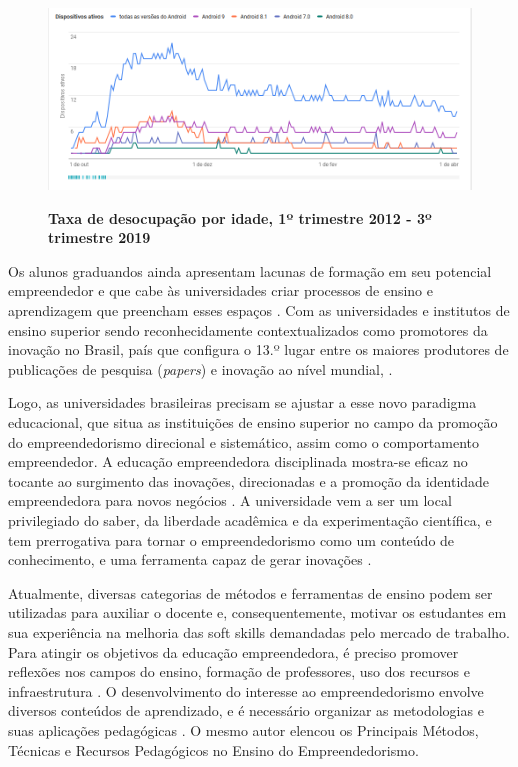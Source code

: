 \begin{figure}[H]
\centering
\caption{\textbf{Taxa de desocupação por idade, 1º trimestre 2012 - 3º trimestre 2019}}
\includegraphics[scale=0.25]{Imagens/taxa_desocupacao.png}
\label{figura_2}
\end{figure}

Os alunos graduandos ainda apresentam lacunas de formação em seu potencial empreendedor e que cabe às universidades criar processos de ensino e aprendizagem que preencham esses espaços \cite{pietrovski_alise_2019}. Com as universidades e institutos de ensino superior sendo reconhecidamente contextualizados como promotores da inovação no Brasil, país que configura o 13.º lugar entre os maiores produtores de publicações de pesquisa (\textit{papers}) e inovação ao nível mundial, . 

Logo, as universidades brasileiras precisam se ajustar a esse novo paradigma educacional, que situa as instituições de ensino superior no campo da promoção do empreendedorismo direcional e sistemático, assim como o comportamento empreendedor. A educação empreendedora disciplinada mostra-se eficaz no tocante ao surgimento das inovações, direcionadas e a promoção da identidade empreendedora para novos negócios \cite{jain_academics_2009}. A universidade vem a ser um local privilegiado do saber, da liberdade acadêmica e da experimentação científica, e tem prerrogativa para tornar o empreendedorismo como um conteúdo de conhecimento, e uma ferramenta capaz de gerar inovações \cite{dolabela_oficina_2008}. 


Atualmente, diversas categorias de métodos e ferramentas de ensino podem ser utilizadas para auxiliar o docente e, consequentemente, motivar os estudantes em sua experiência na melhoria das soft skills demandadas pelo mercado de trabalho. Para atingir os objetivos da educação empreendedora, é preciso promover reflexões nos campos do ensino, formação de professores, uso dos recursos e infraestrutura \cite{marques_experiencia_2019}. O desenvolvimento do interesse ao empreendedorismo envolve diversos conteúdos de aprendizado, e é necessário organizar as metodologias e suas aplicações pedagógicas \cite{rocha_avaliacao_2014}. O mesmo autor elencou os Principais Métodos, Técnicas e Recursos Pedagógicos no Ensino do Empreendedorismo.



